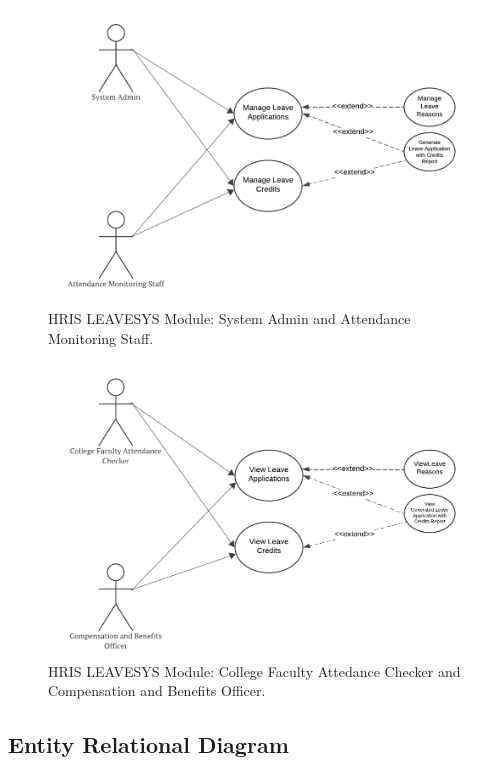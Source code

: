     \begin{figure}[H]
        \centering
        \includegraphics[width=0.9\linewidth]{figures/images/use-case-leave-1.png}
        \caption{HRIS LEAVESYS Module: System Admin and Attendance Monitoring Staff.}
        \label{fig:use-case-leave-1}
    \end{figure}

    \begin{figure}[H]
        \centering
        \includegraphics[width=0.9\linewidth]{figures/images/use-case-leave-2.png}
        \caption{HRIS LEAVESYS Module: College Faculty Attedance Checker and Compensation and Benefits Officer.}
        \label{fig:use-case-leave-2}
    \end{figure}



    
    
    \subsection{Entity Relational Diagram}
    
